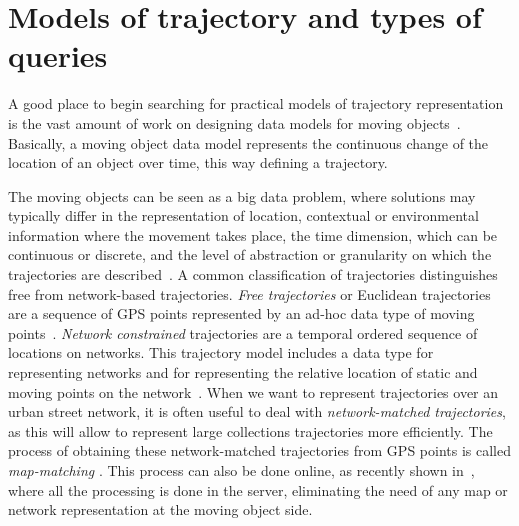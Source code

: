 \documentclass[a4paper,10pt,twoside]{book}
\begin{document}
	\section{Models of trajectory and types of queries}
    A good place to begin searching for practical models of trajectory representation is the vast amount of work on designing data models for moving objects~\cite{DBLP:conf/ssdbm/WolfsonXCJ98,DBLP:conf/icde/SistlaWCD97,DBLP:journals/tods/GutingBEJLSV00,DBLP:conf/chorochronos/GutingBEJLNSV03,DBLP:journals/geoinformatica/Spaccapietra01,DBLP:conf/sigmod/ForlizziGNS00,DBLP:journals/geoinformatica/ErwigGSV99,DBLP:books/mk/GutingS2005}. Basically, a moving object data model represents the continuous change of the location of an object over time, this way defining a trajectory.
    
    The moving objects can be seen as a big data problem, where solutions may typically differ in the representation of location, contextual or environmental information where the movement takes place, the time dimension, which can be continuous or discrete, and the level of abstraction or granularity on which the trajectories are described~\cite{DBLP:journals/sigspatial/DamianiIGV15}. A common classification of trajectories distinguishes free from network-based trajectories.  \textit{Free trajectories} or Euclidean trajectories are a sequence of GPS points represented by an ad-hoc data type of moving points~\cite{DBLP:conf/ssdbm/WolfsonXCJ98,DBLP:conf/icde/SistlaWCD97,DBLP:journals/tods/GutingBEJLSV00}. \textit{Network constrained} trajectories are a temporal ordered sequence of locations on networks. This trajectory model includes a data type for representing  networks and  for representing the relative location of static and moving  points on the network~\cite{DBLP:journals/vldb/GutingAD06}. When we want to represent trajectories over an urban street network, it is often useful to deal with \textit{network-matched trajectories}, as this will allow to represent large collections trajectories more efficiently. The process of obtaining these network-matched trajectories from GPS points is called \textit{map-matching} \cite{brakatsoulas2005map}. This process can also be done online, as recently shown in~\cite{DBLP:journals/tits/Ding0GL15}, where all the processing is done in the server, eliminating the need of any map or network representation at the moving object side.
    
\end{document}
